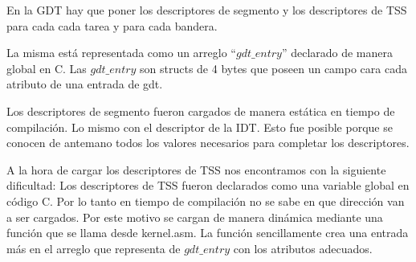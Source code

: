 	En la GDT hay que poner los descriptores de segmento
y los descriptores de TSS para cada cada tarea y para cada bandera.

	La misma está representada como un arreglo ``$gdt\_entry$'' declarado
de manera global en C. Las $gdt\_entry$ son structs de 4 bytes que poseen un campo
cara cada atributo de una entrada de gdt.

	Los descriptores de segmento fueron cargados de manera estática
en tiempo de compilación. Lo mismo con el descriptor de la IDT. Esto
fue posible porque se conocen de antemano todos los valores
necesarios para completar los descriptores.

	A la hora de cargar los descriptores de TSS nos encontramos con la
siguiente dificultad: Los descriptores de TSS fueron declarados como una
variable global en código C. Por lo tanto en tiempo de compilación
no se sabe en que dirección van a ser cargados. Por este motivo se cargan
de manera dinámica mediante una función que se llama desde kernel.asm. La
función sencillamente crea una entrada más en el arreglo que representa 
de $gdt\_entry$ con los atributos adecuados.


